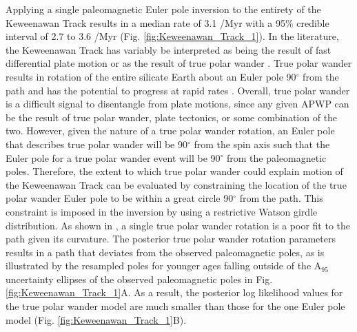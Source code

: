 \documentclass[11pt,letterpaper]{article}
\begin{document}
Applying a single paleomagnetic Euler pole inversion to the entirety of the Keweenawan Track results in a median rate of 3.1 \textdegree/Myr with a 95$\%$ credible interval of 2.7 to 3.6 \textdegree/Myr (Fig. \ref{fig:Keweenawan_Track_1}). In the literature, the Keweenawan Track has variably be interpreted as being the result of fast differential plate motion \citep[e.g.][]{Davis1997a} or as the result of true polar wander \citep[e.g.][]{Evans2003b}. True polar wander results in rotation of the entire silicate Earth about an Euler pole 90$^\circ$ from the path and has the potential to progress at rapid rates \citep{Rose2017b}. Overall, true polar wander is a difficult signal to disentangle from plate motions, since any given APWP can be the result of true polar wander, plate tectonics, or some combination of the two. However, given the nature of a true polar wander rotation, an Euler pole that describes true polar wander will be 90$^\circ$ from the spin axis such that the Euler pole for a true polar wander event will be 90$^\circ$ from the paleomagnetic poles. Therefore, the extent to which true polar wander could explain motion of the Keweenawan Track can be evaluated by constraining the location of the true polar wander Euler pole to be within a great circle 90$^\circ$ from the path. This constraint is imposed in the inversion by using a restrictive Watson girdle distribution. As shown in \cite{Swanson-Hysell2019a}, a single true polar wander rotation is a poor fit to the path given its curvature. The posterior true polar wander rotation parameters results in a path that deviates from the observed paleomagnetic poles, as is illustrated by the resampled poles for younger ages falling outside of the A$_95$ uncertainty ellipses of the observed paleomagnetic poles in Fig. \ref{fig:Keweenawan_Track_1}A. As a result, the posterior log likelihood values for the true polar wander model are much smaller than those for the one Euler pole model (Fig. \ref{fig:Keweenawan_Track_1}B).
\end{document}
